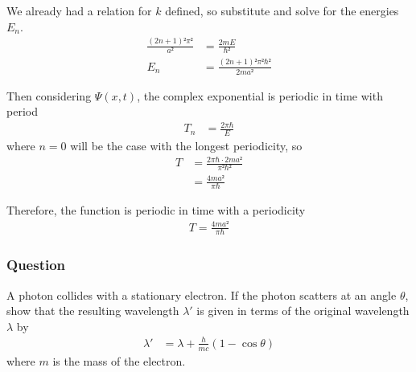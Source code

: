We already had a relation for $k$ defined, so substitute and solve for the
energies $E_n$.
\begin{align*}
	\frac{(2n+1)²π²}{a²} &= \frac{2mE}{\hbar²} \\
	E_n &= \frac{(2n+1)²π²\hbar²}{2ma²}
\end{align*}

Then considering $Ψ(x,t)$, the complex exponential is periodic in time with
period
\begin{align*}
	T_n &= \frac{2π\hbar}{E}
\end{align*}
where $n = 0$ will be the case with the longest periodicity, so
\begin{align*}
	T &= \frac{2π\hbar · 2ma²}{π²\hbar²} \\
	{} &= \frac{4ma²}{π\hbar}
\end{align*}

Therefore, the function is periodic in time with a periodicity
\begin{align}
	\boxed{
	T = \frac{4ma²}{π\hbar}
	}
\end{align}

\subsubsection{Question}

A photon collides with a stationary electron. If the photon scatters at an
angle $θ$, show that the resulting wavelength $λ'$ is given in terms of the
original wavelength $λ$ by
\begin{align*}
	λ' &= λ + \frac{h}{mc} (1 - \cos θ)
\end{align*}
where $m$ is the mass of the electron.

